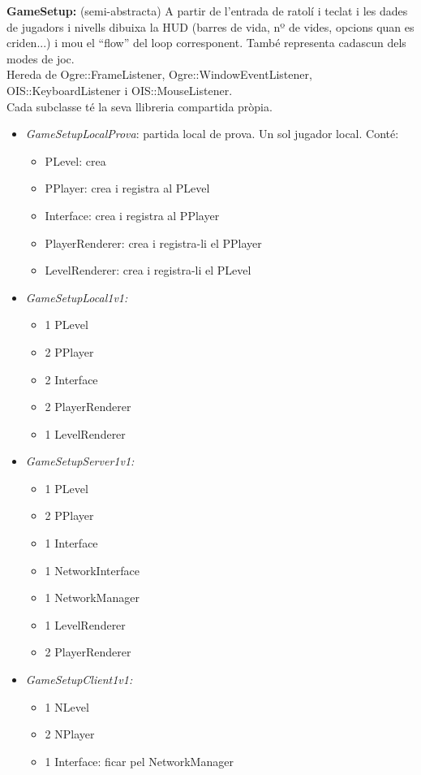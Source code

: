 \documentclass[12pt,a4paper,oneside]{article}
\begin{document}
\textbf{GameSetup:} (semi-abstracta) A partir de l'entrada de ratolí i teclat i les dades de jugadors i nivells dibuixa la HUD (barres de vida, nº de vides, opcions quan es criden...) i mou el ``flow'' del loop corresponent. També representa cadascun dels modes de joc.\\
Hereda de Ogre::FrameListener, Ogre::WindowEventListener, OIS::KeyboardListener i OIS::MouseListener.\\
Cada subclasse té la seva llibreria compartida pròpia.
\begin{itemize}
\item \textit{GameSetupLocalProva}: partida local de prova. Un sol jugador local. Conté:
\begin{itemize}
\item PLevel: crea
\item PPlayer: crea i registra al PLevel
\item Interface: crea i registra al PPlayer
\item PlayerRenderer: crea i registra-li el PPlayer
\item LevelRenderer: crea i registra-li el PLevel
\end{itemize}
\item\textit{GameSetupLocal1v1:}
\begin{itemize}
\item 1 PLevel
\item 2 PPlayer
\item 2 Interface
\item 2 PlayerRenderer
\item 1 LevelRenderer
\end{itemize}
\item\textit{GameSetupServer1v1:}
\begin{itemize}
\item 1 PLevel
\item 2 PPlayer
\item 1 Interface
\item 1 NetworkInterface
\item 1 NetworkManager
\item 1 LevelRenderer
\item 2 PlayerRenderer
\end{itemize}
\item\textit{GameSetupClient1v1:}
\begin{itemize}
\item 1 NLevel
\item 2 NPlayer
\item 1 Interface: ficar pel NetworkManager

\end{itemize}
\end{itemize}
\end{document}
